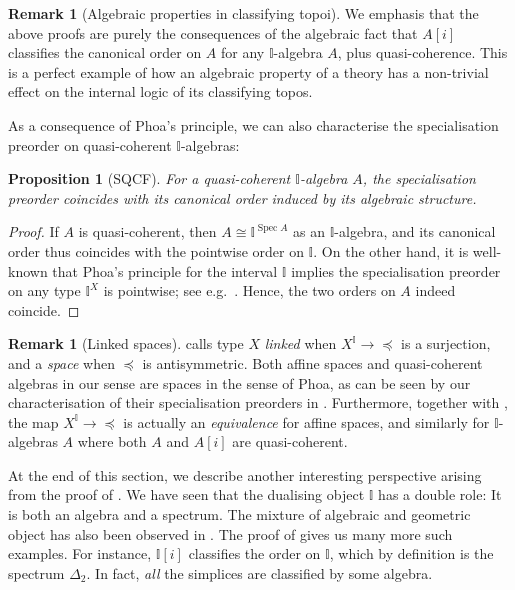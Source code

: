 \documentclass[a4paper,12pt]{amsart}
\newtheorem{proposition}[theorem]{Proposition}
\theoremstyle{definition}
\newtheorem{remark}[theorem]{Remark}
\newcommand{\mbb}[1]{\mathbb{#1}}
\newcommand{\I}{\mbb I}
\newcommand{\spec}{\operatorname{Spec}}
\begin{document}
\begin{remark}[Algebraic properties in classifying topoi]\label{rem:normalalgebra}
  We emphasis that the above proofs are purely the consequences of the algebraic fact that $A[i]$ classifies the canonical order on $A$ for any $\I$-algebra $A$, plus quasi-coherence. This is a perfect example of how an algebraic property of a theory has a non-trivial effect on the internal logic of its classifying topos.
\end{remark}

As a consequence of Phoa's principle, we can also characterise the specialisation preorder on quasi-coherent $\I$-algebras:

\begin{proposition}[SQCF]\label{cor:specordonalgiscan}
  For a quasi-coherent $\I$-algebra $A$, the specialisation preorder coincides with its canonical order induced by its algebraic structure.
\end{proposition}
\begin{proof}
  If $A$ is quasi-coherent, then $A \cong \I^{\spec A}$ as an $\I$-algebra, and its canonical order thus coincides with the pointwise order on $\I$. On the other hand, it is well-known that Phoa's principle for the interval $\I$ implies the specialisation preorder on any type $\I^X$ is pointwise; see e.g.~\cite[Thm.\ 4.2.1]{hyland1990first}. Hence, the two orders on $A$ indeed coincide.
\end{proof}

\begin{remark}[Linked spaces]
  \citet{PhoaWesleyKym-Son1991DtiR} calls type $X$ \emph{linked} when $X^\I \to \operatorname{\preceq}$ is a surjection, and a \emph{space} when $\preceq$ is antisymmetric. Both affine spaces and quasi-coherent algebras in our sense are spaces in the sense of Phoa, as can be seen by our characterisation of their specialisation preorders in . Furthermore, together with , the map $X^\I \to \operatorname{\preceq}$ is actually an \emph{equivalence} for affine spaces, and similarly for $\I$-algebras $A$ where both $A$ and $A[i]$ are quasi-coherent.
\end{remark}

At the end of this section, we describe another interesting perspective arising from the proof of . We have seen that the dualising object $\I$ has a double role: It is both an algebra and a spectrum. The mixture of algebraic and geometric object has also been observed in . The proof of  gives us many more such examples. For instance, $\I[i]$ classifies the order on $\I$, which by definition is the spectrum $\Delta_2$. In fact, \emph{all} the simplices are classified by some algebra.
\end{document}
